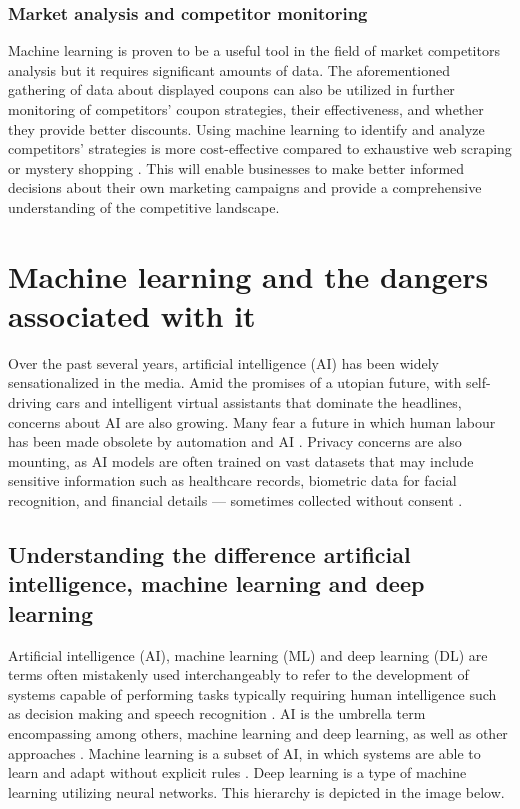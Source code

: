 \documentclass[licencjacka,en]{pracamgr}
\begin{document}
\subsection{Market analysis and competitor monitoring}
Machine learning is proven to be a useful tool in the field of market competitors analysis but it requires significant amounts of data\cite{competitor_tariffs}.
The aforementioned gathering of data about displayed coupons can also be utilized in further monitoring of competitors' coupon strategies, their effectiveness, and whether they provide better discounts. Using machine learning to identify and analyze competitors' strategies is more cost-effective compared to exhaustive web scraping or mystery shopping \cite{competitor_tariffs}. This will enable businesses to make better informed decisions about their own marketing campaigns and provide a comprehensive understanding of the competitive landscape.

\chapter{Machine learning and the dangers associated with it}

Over the past several years, artificial intelligence (AI) has been widely sensationalized in the media. Amid the promises of a utopian future, with self-driving cars and intelligent virtual assistants that dominate the headlines, concerns about AI are also growing. Many fear a future in which human labour has been made obsolete by automation and AI \cite{francuz}. Privacy concerns are also mounting, as AI models are often trained on vast datasets that may include sensitive information such as healthcare records, biometric data for facial recognition, and financial details — sometimes collected without consent \cite{ibm_privacy}.

\section{Understanding the difference artificial intelligence, machine learning and deep learning}
Artificial intelligence (AI), machine learning (ML) and deep learning (DL) are terms often mistakenly used interchangeably to refer to the development of systems capable of performing tasks typically requiring human intelligence such as decision making and speech recognition \cite{ibm_ai}. AI is the umbrella term encompassing among others, machine learning and deep learning, as well as other approaches \cite{francuz}. Machine learning is a subset of AI, in which systems are able to learn and adapt without explicit rules \cite{ibm_ai}. Deep learning is a type of machine learning utilizing neural networks. This hierarchy is depicted in the image below.
\end{document}
